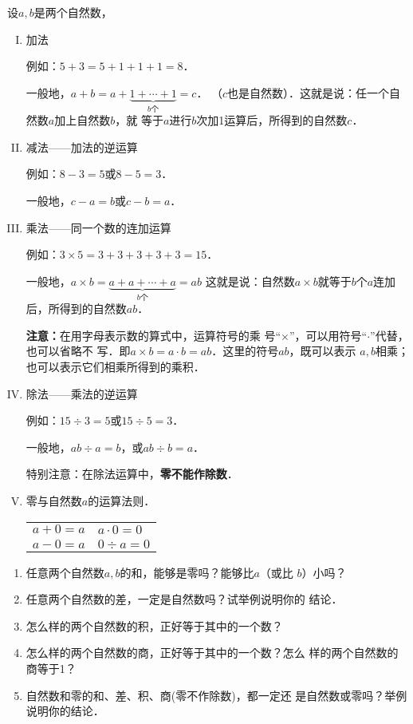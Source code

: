 设$a,b$是两个自然数，
\begin{enumerate}[I. ]
	\item 加法
	
	例如：$5+3=5+1+1+1=8$．
	
	一般地，$a+b=a+\underbrace{1 +\cdots +1}_{b\text{个}} =c$．  
	（$c$也是自然数）．这就是说：任一个自然数$a$加上自然数$b$，就
	等于$a$进行$b$次加1运算后，所得到的自然数$c$．
	\item 减法——加法的逆运算
	
	例如：$8-3=5$或$8-5=3$．
	
	一般地，$c-a=b$或$c-b=a$．
	\item 乘法——同一个数的连加运算
	
	例如：$3\times 5=3+3+3+3+3=15$．
	
	一般地，$a\times b =\underbrace{a+a+\cdots+a}_{b\text{个}}=ab$
	这就是说：自然数$a\times b$就等于$b$个$a$连加后，所得到的自然数$ab$．
	
	\textbf{注意：}在用字母表示数的算式中，运算符号的乘
	号“$\times$”，可以用符号“$\cdot$”代替，也可以省略不
	写．即$a\times b=a\cdot b=ab$．这里的符号$ab$，既可以表示
	$a,  b$相乘；也可以表示它们相乘所得到的乘积．
	
	\item 除法——乘法的逆运算
	
	例如：$15\div 3=5$或$15\div 5=3$．
	
	一般地，$ab\div a= b$，或$ab\div b = a$．
	
	特别注意：在除法运算中，\textbf{零不能作除数}．
	
	\item 零与自然数$a$的运算法则．
	\begin{center}
		\begin{tabular}{p{}p{}}
			$a+0=a$& $a\cdot 0=0$\\
			$a-0=a$&  $0\div a=0$   
		\end{tabular}
	\end{center}
	
\end{enumerate}         

\begin{ex}
	\begin{enumerate}
		\item 任意两个自然数$a,b$的和，能够是零吗？能够比$a$（或比
		$b$）小吗？
		\item 任意两个自然数的差，一定是自然数吗？试举例说明你的
		结论．
		\item 怎么样的两个自然数的积，正好等于其中的一个数？
		\item 怎么样的两个自然数的商，正好等于其中的一个数？怎么
		样的两个自然数的商等于1？
		\item 自然数和零的和、差、积、商(零不作除数)，都一定还
		是自然数或零吗？举例说明你的结论．
		
	\end{enumerate}
\end{ex}

